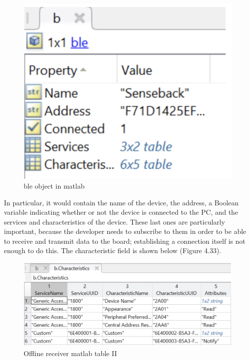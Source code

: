 \documentclass{Configuration_Files/PoliMi3i_thesis}
\begin{document}
\begin{figure}[H]
    \centering
    \includegraphics[scale=0.6]{Board Windows PC/4.png}
    \caption{ble object in matlab}
    \label{boardwindows_4}
\end{figure}

In particular, it would contain the name of the device, the address, a Boolean variable indicating whether or not the device is connected to the PC, and the services and characteristics of the device. These last ones are particularly important, because the developer needs to subscribe to them in order to be able to receive and transmit data to the board; establishing a connection itself is not enough to do this. The characteristic field is shown below (Figure 4.33).

\begin{figure}[H]
    \centering
    \includegraphics[scale=0.6]{Board Windows PC/5.png}
    \caption{Offline receiver matlab table II}
    \label{boardwindows_5}
\end{figure}
\end{document}
